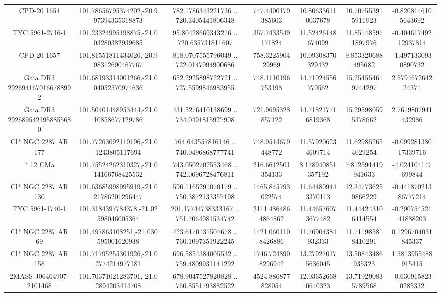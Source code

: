 \begin{table}
\begin{tabular}{ccccccc}
CPD-20  1654 & 101.78656795374202,-20.997394335318873 & 782.1786343221736 .. 720.3405441806348 & 747.4400179385603 & 10.806336110037678 & 10.707553915911923 & -0.8208146105643692 \\
TYC 5961-2716-1 & 101.23324995198875,-21.003280382939685 & 95.80428669343216 .. 720.635731811607 & 357.7433549171824 & 11.52426148674099 & 11.851485971897976 & -0.40461749212937814 \\
CPD-20  1657 & 101.81551811434026,-20.998312690467767 & 818.0707555796049 .. 722.0147094900686 & 758.322590429969 & 10.09308370329432 & 9.853320688495682 & -1.4971330930890732 \\
Gaia DR3 2926941670166788992 & 101.68193314001266,-21.004052570974636 & 652.2925898722721 .. 727.5599846983955 & 748.1110196753198 & 14.71024556770562 & 15.254554619744297 & 2.579467264224371 \\
Gaia DR3 2926895421958855680 & 101.50401448953444,-21.010858677129786 & 431.5276410138699 .. 734.0491815927908 & 721.9695328857122 & 14.718217716819368 & 15.295980595378662 & 2.7619807941432986 \\
Cl* NGC 2287     AR     177 & 101.77263092119196,-21.01243805117694 & 764.643557816146 .. 740.0496868777741 & 748.9514679448772 & 11.579206234609714 & 11.629852654029254 & -0.09928138017339716 \\
*  12 CMa & 101.75524262310327,-21.014166768425532 & 743.0502702553468 .. 742.0696728476811 & 216.6612501354133 & 8.178940851357192 & 7.812591419941633 & -4.024104147699844 \\
Cl* NGC 2287     AR     130 & 101.63685998995919,-21.021786201296447 & 596.1165291070179 .. 750.3872133357198 & 1465.845793022574 & 11.644809443370113 & 12.347736250866229 & -0.44187021386777214 \\
TYC 5961-1740-1 & 101.3184397784378,-21.02598046005364 & 201.17744738333167 .. 751.7064081534742 & 2111.4864864864862 & 11.446576073677482 & 11.444243106414554 & -0.29075452141888203 \\
Cl* NGC 2287     AR      69 & 101.497863108251,-21.030595001620938 & 423.6170131504678 .. 760.1097351922245 & 1421.0601108426886 & 11.76904384932333 & 11.711985818410291 & 0.1296704031845337 \\
Cl* NGC 2287     AR     158 & 101.71795255301926,-21.02774214977181 & 696.5854384005532 .. 759.4809931141292 & 1746.7248908296942 & 13.279270175636045 & 13.50843486935323 & 1.3813955488915415 \\
2MASS J06464907-2101468 & 101.70371021283701,-21.02894203414708 & 678.9047527820828 .. 760.8551793882522 & 4524.886877828054 & 12.036526680640323 & 13.719290835789568 & -0.6309158230285332 \\

\end{tabular}
\end{table}
